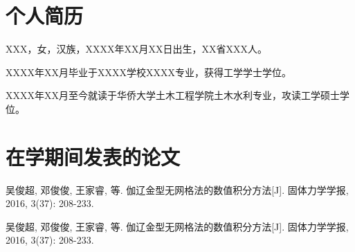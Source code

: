 \begin{cv}
    \section*{个人简历}
    XXX，女，汉族，XXXX年XX月XX日出生，XX省XXX人。

    XXXX年XX月毕业于XXXX学校XXXX专业，获得工学学士学位。

    XXXX年XX月至今就读于华侨大学土木工程学院土木水利专业，攻读工学硕士学位。
    \section*{在学期间发表的论文}
    \begin{enumerate}[{[1]}]
        \item 吴俊超, 邓俊俊, 王家睿, 等. 伽辽金型无网格法的数值积分方法[J]. 固体力学学报, 2016, 3(37): 208-233. 
        \item 吴俊超, 邓俊俊, 王家睿, 等. 伽辽金型无网格法的数值积分方法[J]. 固体力学学报, 2016, 3(37): 208-233. 
    \end{enumerate}

\end{cv}
